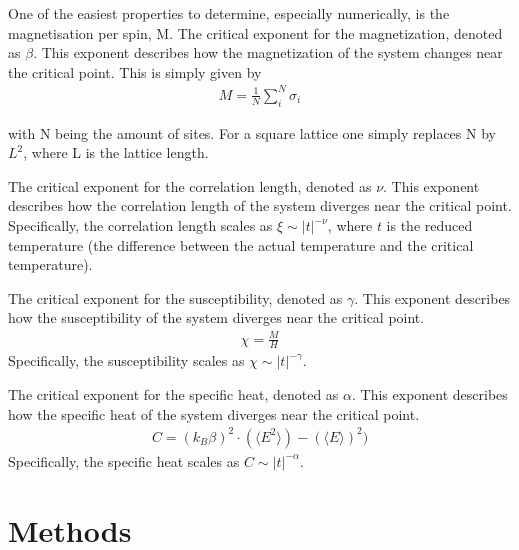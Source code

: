 \documentclass[%
reprint,
 amsmath,amssymb,
 aps,
]{revtex4-2}
\begin{document}
One of the easiest properties to determine, especially numerically, is the magnetisation per spin, M. The critical exponent for the magnetization, denoted as $\beta$. This exponent describes how the magnetization of the system changes near the critical point. This is simply given by 
\begin{align}
    M = \frac{1}{N}\sum_{i}^{N} \sigma_{i}
\end{align}

with N being the amount of sites. For a square lattice one simply replaces N by $L^{2}$, where L is the lattice length.

The critical exponent for the correlation length, denoted as $\nu$. This exponent describes how the correlation length of the system diverges near the critical point. Specifically, the correlation length scales as $\xi \sim |t|^{-\nu}$, where $t$ is the reduced temperature (the difference between the actual temperature and the critical temperature).

The critical exponent for the susceptibility, denoted as $\gamma$. This exponent describes how the susceptibility of the system diverges near the critical point. 
\begin{align}
    \chi = \frac{M}{H} 
\end{align}
Specifically, the susceptibility scales as $\chi \sim |t|^{-\gamma}$.

The critical exponent for the specific heat, denoted as $\alpha$. This exponent describes how the specific heat of the system diverges near the critical point. 
\begin{align}
    C = (k_B \beta)^2 \cdot (\langle E^2 \rangle)-(\langle E \rangle)^2) 
\end{align}
Specifically, the specific heat scales as $C \sim |t|^{-\alpha}$.


\section{Methods}
\end{document}
